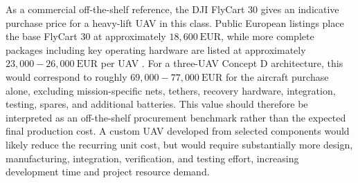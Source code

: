 

As a commercial off-the-shelf reference, the DJI FlyCart 30 gives an indicative purchase price for a heavy-lift UAV in this class. Public European listings place the base FlyCart 30 at approximately \(18{,}600~\mathrm{EUR}\), while more complete packages including key operating hardware are listed at approximately \(23{,}000{-}26{,}000~\mathrm{EUR}\) per UAV \cite{Copters2026FlyCart30,DigitalAgro2026FlyCart30}. For a three-UAV Concept D architecture, this would correspond to roughly \(69{,}000{-}77{,}000~\mathrm{EUR}\) for the aircraft purchase alone, excluding mission-specific nets, tethers, recovery hardware, integration, testing, spares, and additional batteries. This value should therefore be interpreted as an off-the-shelf procurement benchmark rather than the expected final production cost. A custom UAV developed from selected components would likely reduce the recurring unit cost, but would require substantially more design, manufacturing, integration, verification, and testing effort, increasing development time and project resource demand.



